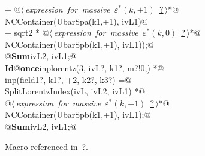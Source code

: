 \documentclass[a4paper,12pt]{amsart}
\renewcommand{\NWlink}[2]{\hyperlink{#1}{#2}}
\renewcommand{\NWtxtMacroRefIn}{Macro referenced in}
\renewcommand{\NWsep}{${\diamond}$}
\begin{document}
\begin{flushleft}
\begin{minipage}{\linewidth}
\begin{list}{}{}
\mbox{}\verb@   + @\hbox{$\langle\,${\it expression for massive $\varepsilon^\ast(k, +1)$}\nobreak\ {\footnotesize \NWlink{nuweb?}{?}}$\,\rangle$}\verb@ *@\\
\mbox{}\verb@     NCContainer(UbarSpa(k1,+1), ivL1)@\\
\mbox{}\verb@   + sqrt2 * @\hbox{$\langle\,${\it expression for massive $\varepsilon^\ast(k, 0)$}\nobreak\ {\footnotesize \NWlink{nuweb?}{?}}$\,\rangle$}\verb@ *@\\
\mbox{}\verb@     NCContainer(UbarSpb(k1,+1), ivL1));@\\
\mbox{}\verb@   @\hbox{\sffamily\bfseries Sum}\verb@ ivL2, ivL1;@\\
\mbox{}\verb@@\hbox{\sffamily\bfseries Id}\verb@ @\hbox{\sffamily\bfseries once}\verb@ inplorentz(3, ivL?, k1?, m?!{0,}) *@\\
\mbox{}\verb@      inp(field1?, k1?, +2, k2?, k3?) =@\\
\mbox{}\verb@   SplitLorentzIndex(ivL, ivL2, ivL1) *@\\
\mbox{}\verb@   @\hbox{$\langle\,${\it expression for massive $\varepsilon^\ast(k, +1)$}\nobreak\ {\footnotesize \NWlink{nuweb?}{?}}$\,\rangle$}\verb@ *@\\
\mbox{}\verb@   NCContainer(UbarSpb(k1,+1), ivL1);@\\
\mbox{}\verb@   @\hbox{\sffamily\bfseries Sum}\verb@ ivL2, ivL1;@\\
\mbox{}\verb@@{\NWsep}
\end{list}
\vspace{-1.5ex}
\footnotesize
\begin{list}{}{\setlength{\itemsep}{-\parsep}\setlength{\itemindent}{-\leftmargin}}
\item \NWtxtMacroRefIn\ \NWlink{nuweb?}{?}.

\item{}
\end{list}
\end{minipage}\vspace{4ex}
\end{flushleft}
\end{document}
